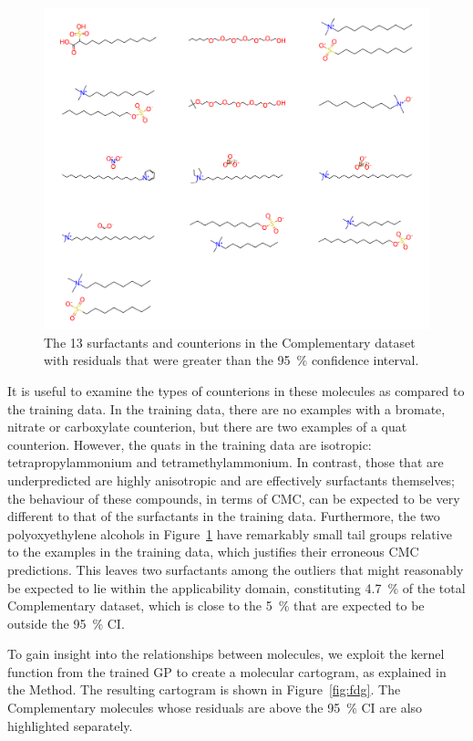\begin{figure}
    \includegraphics[width=\textwidth]{images/nist-underpred.pdf}
    \caption{The 13 surfactants and counterions in the Complementary dataset with residuals
        that were greater than the \SI{95}{\%} confidence interval.}
    \label{fig:nist-underpred}
\end{figure}

It is useful to examine the types of counterions in these molecules as compared
to the training data. In the training data, there are no examples with a
bromate, nitrate or carboxylate counterion, but there are two examples of a quat
counterion. However, the quats in the training data are isotropic:
tetrapropylammonium and tetramethylammonium. In contrast, those that are
underpredicted are highly anisotropic and are effectively surfactants
themselves; the behaviour of these compounds, in terms of CMC, can be expected
to be very different to that of the surfactants in the training data.
Furthermore, the two polyoxyethylene alcohols in Figure~\ref{fig:nist-underpred}
have remarkably small tail groups relative to the examples in the training data,
which justifies their erroneous CMC predictions. This leaves two surfactants
among the outliers that might reasonably be expected to lie within the
applicability domain, constituting \SI{4.7}{\%} of the total Complementary dataset, which
is close to the \SI{5}{\%} that are expected to be outside the \SI{95}{\%} CI.

To gain insight into the relationships between molecules, we exploit the kernel
function from the trained GP to create a molecular cartogram, as explained in
the Method. The resulting cartogram is shown in Figure~\ref{fig:fdg}. The Complementary
molecules whose residuals are above the \SI{95}{\%} CI are also highlighted
separately.

